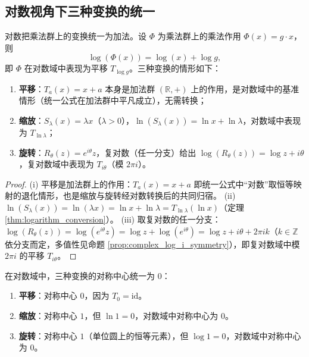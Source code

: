 \subsection{\texorpdfstring{对数视角下三种变换的统一}{对数视角下三种变换的统一}}

\begin{theorem}[对数视角下三种变换的统一]\label{thm:log_unification}
对数把乘法群上的变换统一为加法。设 $\Phi$ 为乘法群上的乘法作用 $\Phi(x) = g \cdot x$，则
\[
\log(\Phi(x)) = \log(x) + \log g,
\]
即 $\Phi$ 在对数域中表现为平移 $T_{\log g}$。三种变换的情形如下：
\begin{enumerate}[label=(\roman*)]
    \item \textbf{平移}：$T_a(x) = x + a$ 本身是加法群 $(\mathbb{R},+)$ 上的作用，是对数域中的基准情形（统一公式在加法群中平凡成立），无需转换；
    \item \textbf{缩放}：$S_\lambda(x) = \lambda x$（$\lambda > 0$），$\ln(S_\lambda(x)) = \ln x + \ln \lambda$，对数域中表现为 $T_{\ln\lambda}$；
    \item \textbf{旋转}：$R_\theta(z) = e^{i\theta}z$，复对数（任一分支）给出 $\log(R_\theta(z)) = \log z + i\theta$，复对数域中表现为 $T_{i\theta}$（模 $2\pi i$）。
\end{enumerate}
\end{theorem}

\begin{proof}
(i) 平移是加法群上的作用：$T_a(x) = x + a$ 即统一公式中“对数”取恒等映射的退化情形，也是缩放与旋转经对数转换后的共同归宿。
(ii) $\ln(S_\lambda(x)) = \ln(\lambda x) = \ln x + \ln \lambda = T_{\ln\lambda}(\ln x)$（定理 \ref{thm:logarithm_conversion}）。
(iii) 取复对数的任一分支：$\log(R_\theta(z)) = \log(e^{i\theta}z) = \log z + \log(e^{i\theta}) = \log z + i\theta + 2\pi i k$（$k \in \mathbb{Z}$ 依分支而定，多值性见命题 \ref{prop:complex_log_i_symmetry}），即复对数域中模 $2\pi i$ 的平移 $T_{i\theta}$。
\end{proof}

\begin{proposition}[对数视角下对称中心的统一]\label{prop:log_symmetry_centre_unification}
在对数域中，三种变换的对称中心统一为 $0$：
\begin{enumerate}[label=(\roman*)]
    \item \textbf{平移}：对称中心 $0$，因为 $T_0 = \text{id}$。
    \item \textbf{缩放}：对称中心 $1$，但 $\ln 1 = 0$，对数域中对称中心为 $0$。
    \item \textbf{旋转}：对称中心 $1$（单位圆上的恒等元素），但 $\log 1 = 0$，对数域中对称中心为 $0$。
\end{enumerate}
\end{proposition}

